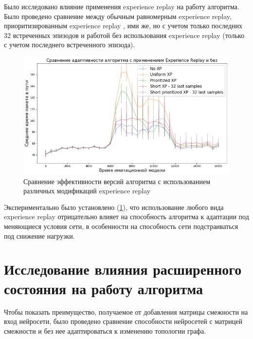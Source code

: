 \documentclass[specification, annotation]{itmo-student-thesis}
\begin{document}
Было исследовано влияние применения experience replay на работу алгоритма. Было
проведено сравнение между обычным равномерным experience replay,
приоритизированным experience replay \cite{schaul2015prioritized}, ими же, но с
учетом только последних 32 встреченных эпизодов и работой без
использования experience replay (только с учетом последнего встреченного эпизода).

\begin{figure}[!h]
  \caption{Сравнение эффективности версий алгоритма с использованием различных
    модификаций experience replay}\label{experiments-xp-variants}
  \centering
  \includegraphics[scale=0.6]{experiments-xp-variants}
\end{figure}

Экспериментально было установлено (\ref{experiments-xp-variants}), что
использование любого вида experience replay отрицательно влияет на способность
алгоритма к адаптации под меняющиеся условия сети, в особенности на способность
сети подстраиваться под снижение нагрузки.

\section{Исследование влияния расширенного состояния на работу алгоритма}\label{apx:amatrix}

Чтобы показать преимущество, получаемое от добавления матрицы смежности на вход
нейросети, было проведено сравнение способности нейросетей с матрицей смежности и
без нее адаптироваться к изменению топологии графа.
\end{document}
